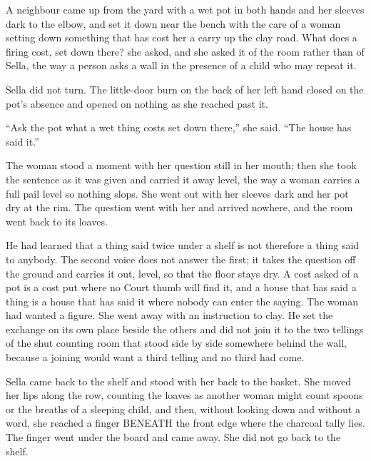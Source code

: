 \scenebreak

A neighbour came up from the yard with a wet pot in both hands and her sleeves dark to the elbow, and set it down near the bench with the care of a woman setting down something that has cost her a carry up the clay road. What does a firing cost, set down there? she asked, and she asked it of the room rather than of Sella, the way a person asks a wall in the presence of a child who may repeat it.

Sella did not turn. The little-door burn on the back of her left hand closed on the pot's absence and opened on nothing as she reached past it.

“Ask the pot what a wet thing costs set down there,” she said. “The house has said it.”

The woman stood a moment with her question still in her mouth; then she took the sentence as it was given and carried it away level, the way a woman carries a full pail level so nothing slops. She went out with her sleeves dark and her pot dry at the rim. The question went with her and arrived nowhere, and the room went back to its loaves.

He had learned that a thing said twice under a shelf is not therefore a thing said to anybody. The second voice does not answer the first; it takes the question off the ground and carries it out, level, so that the floor stays dry. A cost asked of a pot is a cost put where no Court thumb will find it, and a house that has said a thing is a house that has said it where nobody can enter the saying. The woman had wanted a figure. She went away with an instruction to clay. He set the exchange on its own place beside the others and did not join it to the two tellings of the shut counting room that stood side by side somewhere behind the wall, because a joining would want a third telling and no third had come.

\scenebreak

Sella came back to the shelf and stood with her back to the basket. She moved her lips along the row, counting the loaves as another woman might count spoons or the breaths of a sleeping child, and then, without looking down and without a word, she reached a finger BENEATH the front edge where the charcoal tally lies. The finger went under the board and came away. She did not go back to the shelf.

